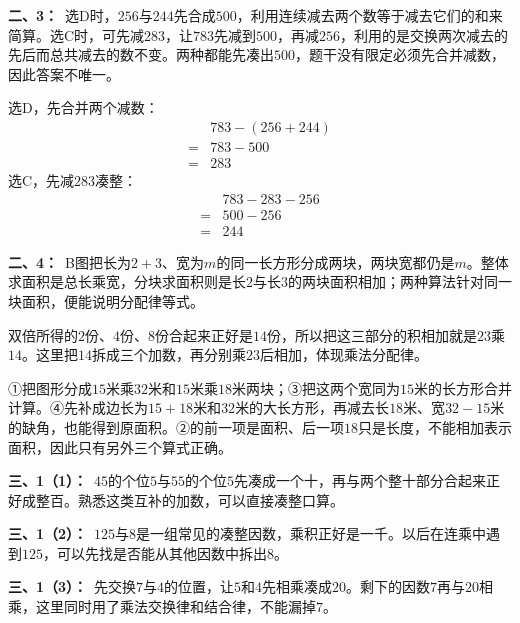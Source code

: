 \documentclass[multi=snippet,border=0pt]{standalone}
\newenvironment{snippet}[3]{\begin{minipage}{#1bp}\color{answerred}\fontsize{#2}{#3}\selectfont\raggedright}{\end{minipage}}
\begin{document}
\begin{snippet}{505}{11.5}{14}\textbf{二、3：}\ 选D时，\(256\)与\(244\)先合成\(500\)，利用连续减去两个数等于减去它们的和来简算。选C时，可先减\(283\)，让\(783\)先减到\(500\)，再减\(256\)，利用的是交换两次减去的先后而总共减去的数不变。两种都能先凑出\(500\)，题干没有限定必须先合并减数，因此答案不唯一。\par 选D，先合并两个减数：\[\begin{aligned}&783-(256+244)\\={}&783-500\\={}&283\end{aligned}\]选C，先减\(283\)凑整：\[\begin{aligned}&783-283-256\\={}&500-256\\={}&244\end{aligned}\]\end{snippet}
\begin{snippet}{505}{11.5}{14}\textbf{二、4：}\ B图把长为\(2+3\)、宽为\(m\)的同一长方形分成两块，两块宽都仍是\(m\)。整体求面积是总长乘宽，分块求面积则是长\(2\)与长\(3\)的两块面积相加；两种算法针对同一块面积，便能说明分配律等式。\end{snippet}
\begin{snippet}{505}{11.5}{14}双倍所得的\(2\)份、\(4\)份、\(8\)份合起来正好是\(14\)份，所以把这三部分的积相加就是\(23\)乘\(14\)。这里把\(14\)拆成三个加数，再分别乘\(23\)后相加，体现乘法分配律。\end{snippet}
\begin{snippet}{505}{11.5}{14}①把图形分成\(15\)米乘\(32\)米和\(15\)米乘\(18\)米两块；③把这两个宽同为\(15\)米的长方形合并计算。④先补成边长为\(15+18\)米和\(32\)米的大长方形，再减去长\(18\)米、宽\(32-15\)米的缺角，也能得到原面积。②的前一项是面积、后一项\(18\)只是长度，不能相加表示面积，因此只有另外三个算式正确。\end{snippet}
\begin{snippet}{505}{11.5}{14}\textbf{三、1（1）：}\ \(45\)的个位\(5\)与\(55\)的个位\(5\)先凑成一个十，再与两个整十部分合起来正好成整百。熟悉这类互补的加数，可以直接凑整口算。\end{snippet}
\begin{snippet}{505}{11.5}{14}\textbf{三、1（2）：}\ \(125\)与\(8\)是一组常见的凑整因数，乘积正好是一千。以后在连乘中遇到\(125\)，可以先找是否能从其他因数中拆出\(8\)。\end{snippet}
\begin{snippet}{505}{11.5}{14}\textbf{三、1（3）：}\ 先交换\(7\)与\(4\)的位置，让\(5\)和\(4\)先相乘凑成\(20\)。剩下的因数\(7\)再与\(20\)相乘，这里同时用了乘法交换律和结合律，不能漏掉\(7\)。\end{snippet}
\end{document}
